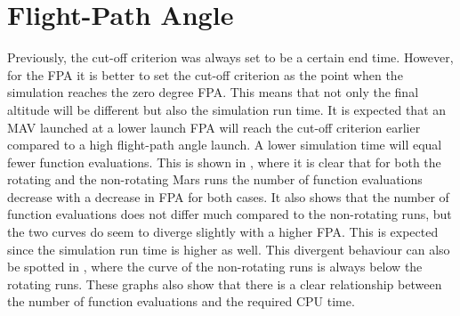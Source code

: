 \section{Flight-Path Angle}
\label{sec:flightPathAngle}
Previously, the cut-off criterion was always set to be a certain end time. However, for the \ac{FPA} it is better to set the cut-off criterion as the point when the simulation reaches the zero degree \ac{FPA}. This means that not only the final altitude will be different but also the simulation run time. It is expected that an \ac{MAV} launched at a lower launch \ac{FPA} will reach the cut-off criterion earlier compared to a high flight-path angle launch. A lower simulation time will equal fewer function evaluations. This is shown in , where it is clear that for both the rotating and the non-rotating Mars runs the number of function evaluations decrease with a decrease in \ac{FPA} for both cases. It also shows that the number of function evaluations does not differ much compared to the non-rotating runs, but the two curves do seem to diverge slightly with a higher \ac{FPA}. This is expected since the simulation run time is higher as well. This divergent behaviour can also be spotted in , where the curve of the non-rotating runs is always below the rotating runs. These graphs also show that there is a clear relationship between the number of function evaluations and the required CPU time.




%


